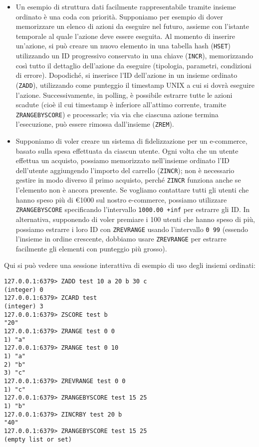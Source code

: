 \begin{itemize}
	\medskip

	\item Un esempio di struttura dati facilmente rappresentabile tramite insieme ordinato è una
	coda con priorità. Supponiamo per esempio di dover memorizzare un elenco di azioni da eseguire
	nel futuro, assieme con l'istante temporale al quale l'azione deve essere eseguita. Al momento
	di inserire un'azione, si può creare un nuovo elemento in una tabella hash (\verb|HSET|)
	utilizzando un ID progressivo conservato in una chiave (\verb|INCR|), memorizzando così tutto
	il dettaglio dell'azione da eseguire (tipologia, parametri, condizioni di errore). Dopodiché,
	si inserisce l'ID dell'azione in un insieme ordinato (\verb|ZADD|), utilizzando come punteggio
	il timestamp UNIX a cui si dovrà eseguire l'azione. Successivamente, in polling, è possibile
	estrarre tutte le azioni scadute (cioè il cui timestamp è inferiore all'attimo corrente,
	tramite \verb|ZRANGEBYSCORE|) e processarle; via via che ciascuna azione termina l'esecuzione,
	può essere rimossa dall'insieme (\verb|ZREM|).

	\item Supponiamo di voler creare un sistema di fidelizzazione per un e-commerce, basato sulla spesa 
	effettuata da ciascun utente. Ogni volta che un utente effettua un acquisto, possiamo
	memorizzato nell'insieme ordinato l'ID dell'utente aggiungendo l'importo del carrello
	(\verb|ZINCR|); non è necessario gestire in modo diverso il primo acquisto, perché \verb|ZINCR|
	funziona anche se l'elemento non è ancora presente. Se vogliamo contattare tutti gli utenti che
	hanno speso più di €1000 sul nostro e-commerce, possiamo utilizzare \verb|ZRANGEBYSCORE|
	specificando l'intervallo \verb|1000.00 +inf| per estrarre gli ID. In alternativa, supponendo
	di voler premiare i 100 utenti che hanno speso di più, possiamo estrarre i loro ID con
	\verb|ZREVRANGE| usando l'intervallo \verb|0 99| (essendo l'insieme in ordine crescente,
	dobbiamo usare \verb|ZREVRANGE| per estrarre facilmente gli elementi con punteggio più grosso).
\end{itemize}

Qui si può vedere una sessione interattiva di esempio di uso degli insiemi ordinati:

\medskip
\begin{lstlisting}
127.0.0.1:6379> ZADD test 10 a 20 b 30 c
(integer) 0
127.0.0.1:6379> ZCARD test
(integer) 3
127.0.0.1:6379> ZSCORE test b
"20"
127.0.0.1:6379> ZRANGE test 0 0
1) "a"
127.0.0.1:6379> ZRANGE test 0 10
1) "a"
2) "b"
3) "c"
127.0.0.1:6379> ZREVRANGE test 0 0
1) "c"
127.0.0.1:6379> ZRANGEBYSCORE test 15 25
1) "b"
127.0.0.1:6379> ZINCRBY test 20 b
"40"
127.0.0.1:6379> ZRANGEBYSCORE test 15 25
(empty list or set)
\end{lstlisting}


